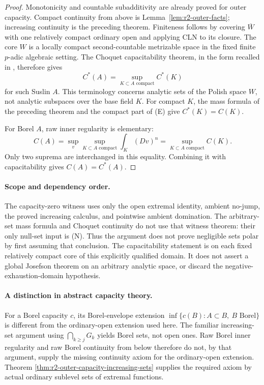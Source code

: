 \begin{proof}
Monotonicity and countable subadditivity are already proved for
outer capacity. Compact continuity from above is
Lemma~\ref{lem:r2-outer-facts}; increasing continuity is the preceding
theorem. Finiteness follows by covering $\overline W$ with one
relatively compact ordinary open and applying CLN to its closure.
The core $W$ is a locally compact second-countable metrizable space
in the fixed finite $p$-adic algebraic setting. The Choquet
capacitability theorem, in the form recalled in
\cite[\S8, following Theorem 8.2]{BT82}, therefore gives
\[
 C^*(A)=\sup_{K\subset A\text{ compact}}C^*(K)
\]
for such Suslin $A$. This terminology concerns analytic sets of the
Polish space $W$, not analytic subspaces over the base field $K$.
For compact $K$, the mass formula of the
preceding theorem and the compact part of \textup{(E)} give
$C^*(K)=C(K)$.

For Borel $A$, raw inner regularity is elementary:
\[
 C(A)=\sup_{v}\sup_{K\subset A\text{ compact}}
       \int_K(Dv)^n
     =\sup_{K\subset A\text{ compact}}C(K).
\]
Only two suprema are interchanged in this equality. Combining it
with capacitability gives $C(A)=C^*(A)$.
\end{proof}

\paragraph{Scope and dependency order.}
The capacity-zero witness uses only the open extremal identity,
ambient no-jump, the proved increasing calculus, and pointwise
ambient domination. The arbitrary-set mass formula and Choquet
continuity do not use that witness theorem: their only null-set
input is \textup{(N)}. Thus the argument does not prove negligible
sets polar by first assuming that conclusion. The capacitability
statement is on each fixed relatively compact core of this explicitly
qualified domain. It does not assert a global Josefson theorem on an
arbitrary analytic space, or discard the negative-exhaustion-domain
hypothesis.

\paragraph{A distinction in abstract capacity theory.}
For a Borel capacity $c$, its Borel-envelope extension
$\inf\{c(B): A\subset B,\ B\text{ Borel}\}$ is different from
the ordinary-open extension used here. The familiar increasing-set
argument using $\bigcap_{k\geq j}G_k$ yields Borel sets, not open
ones. Raw Borel inner regularity and raw Borel continuity from below
therefore do not, by that argument, supply the missing continuity
axiom for the ordinary-open extension. Theorem
\ref{thm:r2-outer-capacity-increasing-sets} supplies the required
axiom by actual ordinary sublevel sets of extremal functions.
